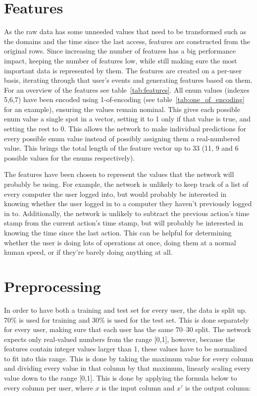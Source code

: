 \section{Features}
As the raw data has some unneeded values that need to be transformed such as the domains and the time since the last access, features are constructed from the original rows. Since increasing the number of features has a big performance impact, keeping the number of features low, while still making sure the most important data is represented by them. The features are created on a per-user basis, iterating through that user's events and generating features based on them. For an overview of the features see table~\ref{tab:features}. All enum values (indexes 5,6,7) have been encoded using 1-of-encoding (see table~\ref{tab:one_of_encoding} for an example), ensuring the values remain nominal. This gives each possible enum value a single spot in a vector, setting it to 1 only if that value is true, and setting the rest to 0. This allows the network to make individual predictions for every possible enum value instead of possibly assigning them a real-numbered value. This brings the total length of the feature vector up to 33 (11, 9 and 6 possible values for the enums respectively).

The features have been chosen to represent the values that the network will probably be using. For example, the network is unlikely to keep track of a list of every computer the user logged into, but would probably be interested in knowing whether the user logged in to a computer they haven't previously logged in to. Additionally, the network is unlikely to subtract the previous action's time stamp from the current action's time stamp, but will probably be interested in knowing the time since the last action. This can be helpful for determining whether the user is doing lots of operations at once, doing them at a normal human speed, or if they're barely doing anything at all.

\section{Preprocessing}
In order to have both a training and test set for every user, the data is split up. 70\% is used for training and 30\% is used for the test set. This is done separately for every user, making sure that each user has the same 70--30 split. The network expects only real-valued numbers from the range [0,1], however, because the features contain integer values larger than 1, these values have to be normalized to fit into this range. This is done by taking the maximum value for every column and dividing every value in that column by that maximum, linearly scaling every value down to the range [0,1]. This is done by applying the formula below to every column per user, where \(x\) is the input column and \(x'\) is the output column:

